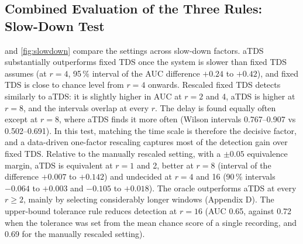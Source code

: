 \documentclass[11pt,a4paper]{article}
\begin{document}
\subsection{Combined Evaluation of the Three Rules: Slow-Down Test}
\label{sec:slowdown}
 and \cref{fig:slowdown} compare the settings across slow-down factors. aTDS substantially outperforms fixed TDS once the system is slower than fixed TDS assumes (at $r = 4$, 95\,\% interval of the AUC difference $+0.24$ to $+0.42$), and fixed TDS is close to chance level from $r = 4$ onwards. Rescaled fixed TDS detects similarly to aTDS: it is slightly higher in AUC at $r = 2$ and 4, aTDS is higher at $r = 8$, and the intervals overlap at every $r$. The delay is found equally often except at $r = 8$, where aTDS finds it more often (Wilson intervals 0.767--0.907 vs 0.502--0.691). In this test, matching the time scale is therefore the decisive factor, and a data-driven one-factor rescaling captures most of the detection gain over fixed TDS. Relative to the manually rescaled setting, with a $\pm0.05$ equivalence margin, aTDS is equivalent at $r = 1$ and 2, better at $r = 8$ (interval of the difference $+0.007$ to $+0.142$) and undecided at $r = 4$ and 16 (90\,\% intervals $-0.064$ to $+0.003$ and $-0.105$ to $+0.018$). The oracle outperforms aTDS at every $r \ge 2$, mainly by selecting considerably longer windows (Appendix D). The upper-bound tolerance rule reduces detection at $r = 16$ (AUC 0.65, against 0.72 when the tolerance was set from the mean chance score of a single recording, and 0.69 for the manually rescaled setting).

\begin{table}[t]
\centering
\caption{Slow-down test ($\tau_c = 2r$, $d = 5r$, coupling 0.3; 100 coupled and 100 uncoupled pairs per $r$): AUC [95\,\% interval]; share of coupled pairs with the delay found; aTDS parameters (window / lag / tolerance, samples). Manually rescaled and oracle settings: Appendix D.}
\label{tab:slowdown}
\end{table}
\end{document}
